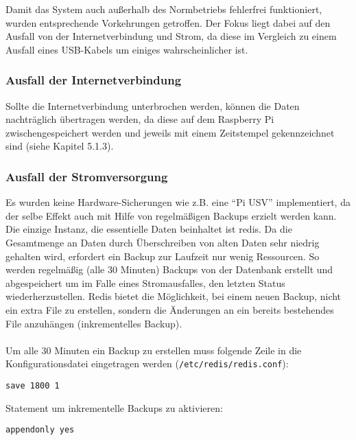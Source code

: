 Damit das System auch außerhalb des Normbetriebs fehlerfrei funktioniert, wurden entsprechende Vorkehrungen getroffen. Der Fokus liegt dabei auf den Ausfall von der Internetverbindung und Strom, da diese im Vergleich zu einem Ausfall eines \gls{USB}-Kabels um einiges wahrscheinlicher ist. 

\subsubsection{Ausfall der Internetverbindung}
Sollte die Internetverbindung unterbrochen werden, können die Daten nachträglich übertragen werden, da diese auf dem Raspberry Pi zwischengespeichert werden und jeweils mit einem Zeitstempel gekennzeichnet sind (siehe Kapitel 5.1.3). 

\subsubsection{Ausfall der Stromversorgung}
Es wurden keine Hardware-Sicherungen wie z.B. eine "`Pi \gls{USV}"' \cite{USV} implementiert, da der selbe Effekt auch mit Hilfe von regelmäßigen Backups erzielt werden kann. Die einzige Instanz, die essentielle Daten beinhaltet ist redis. Da die Gesamtmenge an Daten durch Überschreiben von alten Daten sehr niedrig gehalten wird, erfordert ein Backup zur Laufzeit nur wenig Ressourcen. So werden regelmäßig (alle 30 Minuten) Backups von der Datenbank erstellt und abgespeichert um im Falle eines Stromausfalles, den letzten Status wiederherzustellen. Redis bietet die Möglichkeit, bei einem neuen Backup, nicht ein extra File zu erstellen, sondern die Änderungen an ein bereits bestehendes File anzuhängen (inkrementelles Backup). \\ \mbox{} \\
Um alle 30 Minuten ein Backup zu erstellen muss folgende Zeile in die Konfigurationsdatei eingetragen werden (\texttt{/etc/redis/redis.conf}):
\begin{center}
\texttt{save 1800 1}
\end{center}
Statement um inkrementelle Backups zu aktivieren:
\begin{center}
\texttt{appendonly yes}
\end{center}